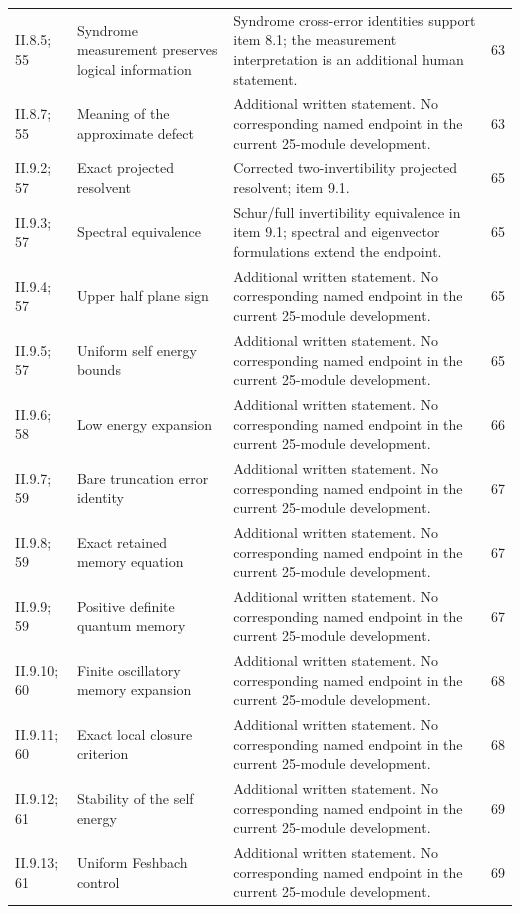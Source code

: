 {\begin{longtable}{@{}p{.13\linewidth}p{.31\linewidth}p{.42\linewidth}r@{}}
II.8.5; 55 & Syndrome measurement preserves logical information & Syndrome cross-error identities support item 8.1; the measurement interpretation is an additional human statement. & 63\\
II.8.7; 55 & Meaning of the approximate defect & Additional written statement. No corresponding named endpoint in the current 25-module development. & 63\\
II.9.2; 57 & Exact projected resolvent & Corrected two-invertibility projected resolvent; item 9.1. & 65\\
II.9.3; 57 & Spectral equivalence & Schur/full invertibility equivalence in item 9.1; spectral and eigenvector formulations extend the endpoint. & 65\\
II.9.4; 57 & Upper half plane sign & Additional written statement. No corresponding named endpoint in the current 25-module development. & 65\\
II.9.5; 57 & Uniform self energy bounds & Additional written statement. No corresponding named endpoint in the current 25-module development. & 65\\
II.9.6; 58 & Low energy expansion & Additional written statement. No corresponding named endpoint in the current 25-module development. & 66\\
II.9.7; 59 & Bare truncation error identity & Additional written statement. No corresponding named endpoint in the current 25-module development. & 67\\
II.9.8; 59 & Exact retained memory equation & Additional written statement. No corresponding named endpoint in the current 25-module development. & 67\\
II.9.9; 59 & Positive definite quantum memory & Additional written statement. No corresponding named endpoint in the current 25-module development. & 67\\
II.9.10; 60 & Finite oscillatory memory expansion & Additional written statement. No corresponding named endpoint in the current 25-module development. & 68\\
II.9.11; 60 & Exact local closure criterion & Additional written statement. No corresponding named endpoint in the current 25-module development. & 68\\
II.9.12; 61 & Stability of the self energy & Additional written statement. No corresponding named endpoint in the current 25-module development. & 69\\
II.9.13; 61 & Uniform Feshbach control & Additional written statement. No corresponding named endpoint in the current 25-module development. & 69\\

\end{longtable}}
